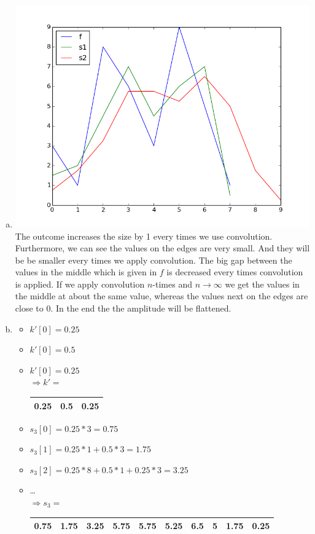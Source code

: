 \documentclass[12pt]{article}
\begin{document}
\begin{enumerate}[a)]
\item
\includegraphics[scale=0.4]{plot81c.png}
The outcome increases the size by 1 every times we use convolution. Furthermore, we can see the values on the edges are very small. And they will be be smaller every times we apply convolution. The big gap between the values in the middle which is given in $f$ is decreased every times convolution is applied. If we apply convolution $n$-times and $n \rightarrow \infty$ we get the values in the middle at about the same value, whereas the values next on the edges are close to 0. In the end the the amplitude will be flattened.

\item
\begin{itemize}
	\item $k'[0]=0.25$
	\item $k'[0]=0.5$
	\item $k'[0]=0.25$\\
	$\Rightarrow k'= $\begin{tabular}{|c|c|c|}
	\hline 0.25 & 0.5 & 0.25 \\ \hline
	\end{tabular}
	\item $s_3[0]= 0.25*3= 0.75$
	\item $s_3[1]= 0.25*1+0.5*3=1.75$
	\item $s_3[2]= 0.25*8+0.5*1+0.25*3=3.25$
	\item \dots \\
	$\Rightarrow s_3=$
	\begin{tabular}{|c|c|c|c|c|c|c|c|c|c|}
		\hline
		0.75 & 1.75 & 3.25 & 5.75 & 5.75 & 5.25 & 6.5 & 5 & 1.75 & 0.25\\ \hline
	\end{tabular}
\end{itemize}


\end{enumerate}
\end{document}

